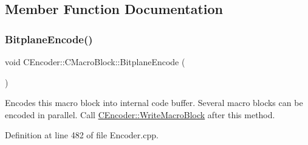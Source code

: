 \subsection{Member Function Documentation}
\mbox{\label{classCEncoder_1_1CMacroBlock_af95842ac15879ab2b3a9b5232bb4f1a5}} 
\subsubsection{\texorpdfstring{BitplaneEncode()}{BitplaneEncode()}}
{\footnotesize\ttfamily void C\+Encoder\+::\+C\+Macro\+Block\+::\+Bitplane\+Encode (\begin{DoxyParamCaption}{ }\end{DoxyParamCaption})}

Encodes this macro block into internal code buffer. Several macro blocks can be encoded in parallel. Call \mbox{\hyperlink{classCEncoder_ab64923561baadef47bea653e9a52238e}{C\+Encoder\+::\+Write\+Macro\+Block}} after this method. 

Definition at line 482 of file Encoder.\+cpp.


